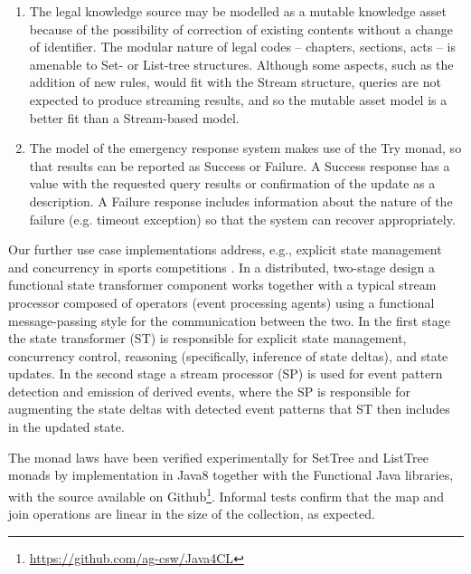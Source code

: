 \documentclass[runningheads]{llncs}
\begin{document}
\begin{enumerate}
\item The legal knowledge source may be modelled as a mutable knowledge asset  because of the possibility of correction of existing contents without a change of identifier. The modular nature of legal codes -- chapters, sections, acts -- is amenable to Set- or List-tree structures. Although some aspects, such as the addition of new rules, would fit with the Stream structure, queries are not expected to produce streaming results, and so the mutable asset model is a better fit than a Stream-based model.

\item The model of the emergency response system makes use of the Try monad, so that results can be reported as Success or Failure. A Success response has a value with the requested query results or confirmation of the update as a description. A Failure response includes information about the nature of the failure (e.g. timeout exception) so that the system can recover appropriately.

\end{enumerate}

Our further use case implementations address, e.g., explicit state management and concurrency in sports competitions \cite{JefferyKP09}. In a distributed, two-stage design a functional state transformer component works together with a typical stream processor composed of operators (event processing agents) using a functional message-passing style for the communication between the two. In the first stage the state transformer (ST) is responsible for explicit state management, concurrency control, reasoning (specifically, inference of state deltas), and state updates. In the second stage a stream processor (SP) is used for event pattern detection and emission of derived events, where the SP is responsible for augmenting the state deltas with detected event patterns that ST then includes in the updated state. 


The monad laws have been verified experimentally for SetTree and ListTree monads by implementation in Java8 together with the Functional Java libraries, with the source available on Github\footnote{\url{https://github.com/ag-csw/Java4CL}}. Informal tests confirm that the map and join operations are linear in the size of the collection, as expected.
\end{document}

